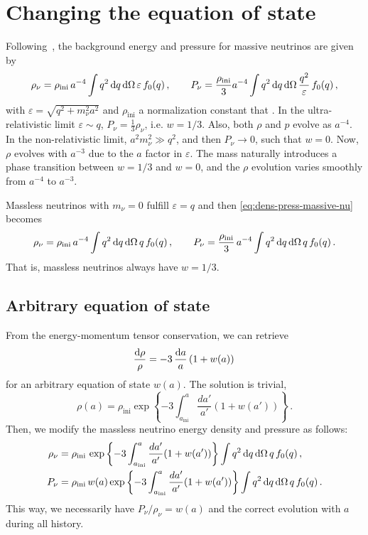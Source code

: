 \section{Changing the equation of state}
Following~\cite{Ma1995}, the background energy and pressure for massive neutrinos are given by
\begin{equation}\label{eq:dens-press-massive-nu}
    \rho_\nu = \rho_{\mathrm{ini}}\, a^{-4} \int q^2\,  \mathrm{d} q\, \mathrm{d}\Omega\,  \varepsilon\,  f_0(q)\, ,\qquad
    P_\nu = \frac{\rho_{\mathrm{ini}}}{3}a^{-4} \int q^2\, \mathrm{d} q\,  \mathrm{d}\Omega\, \frac{q^2}{\varepsilon}\, f_0(q) \, ,
\end{equation}with $\varepsilon = \sqrt{q^2 + m_\nu^2 a^2}$ and $\rho_{\mathrm{ini}}$ a normalization constant that . In the ultra-relativistic limit $\varepsilon\sim q$, $P_\nu = \frac{1}{3}\rho_\nu$, i.e. $w = 1/3$. Also, both $\rho$ and $p$ evolve as $a^{-4}$. In the non-relativistic limit, $a^2m_\nu^2\gg q^2$, and then $P_\nu \to 0$, such that $w = 0$. Now, $\rho$ evolves with $a^{-3}$ due to the $a$ factor in $\varepsilon$. The mass naturally introduces a phase transition between $w = 1/3$ and $w=0$, and the $\rho$ evolution varies smoothly from $a^{-4}$ to $a^{-3}$. 

Massless neutrinos with $m_\nu=0$ fulfill $\varepsilon = q$ and then \eqref{eq:dens-press-massive-nu} becomes 
\begin{equation}
    \rho_\nu = \rho_{\mathrm{ini}}\, a^{-4}  \int q^2\,  \mathrm{d} q \, \mathrm{d} \Omega\,  q\,  f_0(q)\, ,\qquad
    P_\nu = \frac{\rho_{\mathrm{ini}}}{3}\, a^{-4} \int q^2\, \mathrm{d} q\,  \mathrm{d} \Omega\,  q\,  f_0(q) \, .
\end{equation}That is, massless neutrinos always have $w = 1/3$. 

\subsection{Arbitrary equation of state}
From the energy-momentum tensor conservation, we can retrieve
\begin{equation}
    \frac{\mathrm{d} \rho}{\rho} = -3\, \frac{\mathrm{d} a}{a}\, (1+w(a))\, 
\end{equation}for an arbitrary equation of state $w(a)$. The solution is trivial,
\begin{equation}
    \rho(a) = \rho_{\mathrm{ini}} \exp\left\{-3\int_{a_{\mathrm{ini}}}^a \frac{da'}{a'}(1+w(a')) \right\}\, .
\end{equation}
Then, we modify the massless neutrino energy density and pressure as follows:
\begin{align}\label{eq:eos-energy-density}
    \rho_\nu &= \rho_{\mathrm{ini}}\, \exp\left\{-3\int_{a_{\mathrm{ini}}}^a \frac{da'}{a'}(1+w(a')) \right\}\int q^2\,  \mathrm{d} q \, \mathrm{d} \Omega\,  q\,  f_0(q)\, ,\qquad \\
    P_\nu &= \rho_{\mathrm{ini}}\, w(a)\exp\left\{-3\int_{a_{\mathrm{ini}}}^a \frac{da'}{a'}(1+w(a')) \right\} \int q^2\, \mathrm{d} q\,  \mathrm{d} \Omega\,  q\,  f_0(q) \, . \label{eq:eos-pressure}
\end{align}This way, we necessarily have $P_\nu/\rho_\nu = w(a)$ and the correct evolution with $a$ during all history. 

